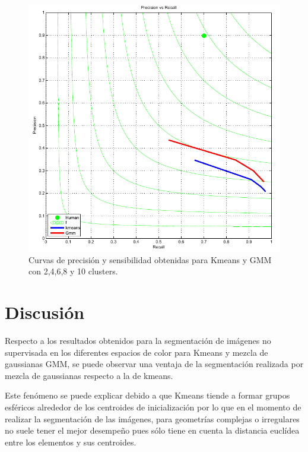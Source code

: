 \documentclass[10pt,twocolumn,letterpaper]{article}
\begin{document}
\begin{figure}[t]
\begin{flushleft}
   \includegraphics[width=1.1\linewidth]{graf_P_R}
\end{flushleft}
   \caption{Curvas de precisión y sensibilidad obtenidas para Kmeans y GMM con 2,4,6,8 y 10 clusters.}
\label{fig:seg}
\end{figure}

\section{Discusión}

Respecto a los resultados obtenidos para la segmentación de imágenes no supervisada en los diferentes espacios de color para Kmeans y mezcla de gaussianas GMM, se puede observar una ventaja de la segmentación realizada por mezcla de gaussianas respecto a la de kmeans. 

Este fenómeno se puede explicar debido a que Kmeans tiende a formar grupos esféricos alrededor de los centroides de inicialización por lo que en el momento de realizar la segmentación de las imágenes, para geometrías complejas o irregulares no suele tener el mejor desempeño pues sólo tiene en cuenta la distancia euclídea entre los elementos y sus centroides.
\end{document}
